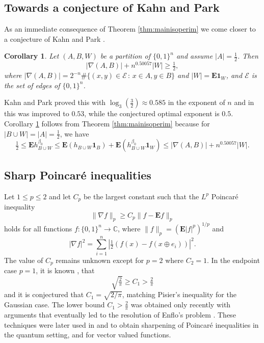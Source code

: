 \documentclass[12pt]{amsart}
\theoremstyle{plain}
\newtheorem{cor}[thm]{Corollary}
\theoremstyle{definition}
\theoremstyle{remark}
\numberwithin{equation}{section}
\begin{document}
\subsection{Towards a conjecture of Kahn and Park}

As an immediate consequence of Theorem \ref{thm:mainisoperim} we come closer to a conjecture of Kahn and Park \cite[Conjecture 1.3]{KP20}.
\begin{cor}\label{cor:kahnpark}
Let $(A,B,W)$ be a partition of $\{0,1\}^n$ and assume $|A|=\frac12$. Then
\[ |\nabla(A,B)| + n^{0.50057} |W|\ge \tfrac12, \]
where $|\nabla(A,B)|=2^{-n} \# \{(x,y)\in \mathcal{E}\,:\,x\in A, y\in B\}$ and $|W|=\mathbf{E} \mathbf{1}_W$, and $\mathcal{E}$ is the set of edges of $\{0,1\}^n$.
\end{cor}
Kahn and Park proved this with $\log_3(\frac32)\approx 0.585$ in the exponent of $n$ and in \cite[Cor. 1.6]{BIM23} this was improved to $0.53$, while the conjectured optimal exponent is $0.5$. Corollary \ref{cor:kahnpark} follows from Theorem \ref{thm:mainisoperim} because for $|B\cup W|=|A|=\frac12$, we have
\[ \tfrac12\le \mathbf{E} h_{B\cup W}^{\beta_0} \le \mathbf{E} (h_{B\cup W}\mathbf{1}_B) + \mathbf{E} (h_{B\cup W}^{\beta_0}\mathbf{1}_W) \le |\nabla(A,B)| + n^{0.50057} |W|. \]

\subsection{Sharp Poincar\'e inequalities}
Let $1\leq p\le 2$ and let $C_p$ be the largest constant such that the   $L^p$ Poincar{\'e} inequality 
\[\|\nabla f\|_p \geq C_p \|f-\mathbf{E} f\|_p \]
holds for all functions $f:\{0,1\}^n\to \mathbb{C}$, where $\|f\|_p=(\mathbf{E}|f|^p)^{1/p}$ and 
\[|\nabla f|^2=\sum_{i=1}^n |\tfrac12(f(x)-f(x\oplus e_i))|^2.\]
The value of $C_{p}$  remains unknown except for $p=2$ where $C_2=1$.  In the endpoint case $p=1$, it is known \cite{BELP08}, \cite{ILvHV} that
\[ \sqrt{\tfrac{2}{\pi}}\ge C_1>\tfrac{2}\pi\]
and it is conjectured that $C_1=\sqrt{2/\pi}$, matching Pisier's inequality \cite{pis02} for the Gaussian case. 
The lower bound $C_{1}>\frac{2}{\pi}$ was obtained only recently \cite{ILvHV} with arguments that eventually led to the resolution of Enflo's problem \cite{IVH}. These techniques were later used in \cite{haonan1} and  \cite{Esken1} to obtain sharpening of Poincar\'e inequalities in the quantum setting, and for vector valued functions. 
\end{document}
